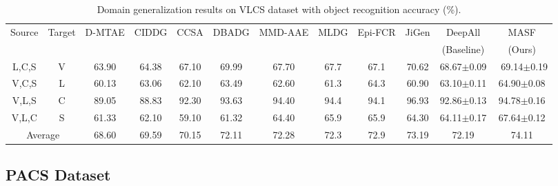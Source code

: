 \documentclass{article}
\newcommand\Tstrut{\rule{0pt}{2.6ex}}         \newcommand\Bstrut{\rule[-0.9ex]{0pt}{0pt}}
\begin{document}
\vspace{-2mm}
\begin{table}[h]
    \centering
    \caption{Domain generalization results on VLCS dataset with object recognition accuracy (\%).}
    \setlength{\tabcolsep}{3pt}
    \begin{adjustbox}{scale=.80}
    \begin{tabular}{cc|cccccccc|cc}
    \toprule
    \multirow{2}{*}{Source}  & \multirow{2}{*}{Target}  & D-MTAE  & CIDDG & CCSA & DBADG  & MMD-AAE & MLDG  & Epi-FCR  & JiGen & DeepAll  & MASF \\
     & & \citep{ghifary2015domain} & \citep{li2018deep}  & \citep{motiian2017unified} & \citep{li2017deeper} & \citep{li2018domain} & \citep{li2018learning}   & \citep{li2019episodic}  & \citep{carlucci2019domain} & (Baseline) & (Ours) \\
    \hline
          {L},{C},{S}    &  V      & 63.90  & 64.38 & 67.10 & 69.99  & 67.70 & 67.7   & 67.1   & 70.62  & 68.67$\pm$0.09  & ~69.14$\pm$0.19  \Tstrut \\
          {V},{C},{S}    &  L      & 60.13  & 63.06 & 62.10 & 63.49  & 62.60 & 61.3   & 64.3   & 60.90  & 63.10$\pm$0.11  & 64.90$\pm$0.08   \\
          {V},{L},{S}    &  C      & 89.05  & 88.83 & 92.30 & 93.63  & 94.40 & 94.4   & 94.1   & 96.93  & 92.86$\pm$0.13  & 94.78$\pm$0.16   \\
          {V},{L},{C}    &  S      & 61.33  & 62.10 & 59.10 & 61.32  & 64.40 & 65.9   & 65.9   & 64.30  & 64.11$\pm$0.17  & 67.64$\pm$0.12   \\
    \hline
\multicolumn{2}{c|}{Average}       & 68.60  & 69.59 & 70.15 & 72.11   & 72.28  & 72.3   & 72.9   & 73.19  & 72.19  & 74.11  \Tstrut \\
    \bottomrule
    \end{tabular}
    \end{adjustbox}
    \label{tab:vlcs}
\end{table}
\vspace{-2mm}


\subsection{PACS Dataset}
\label{sec:exp_pacs}
\end{document}
